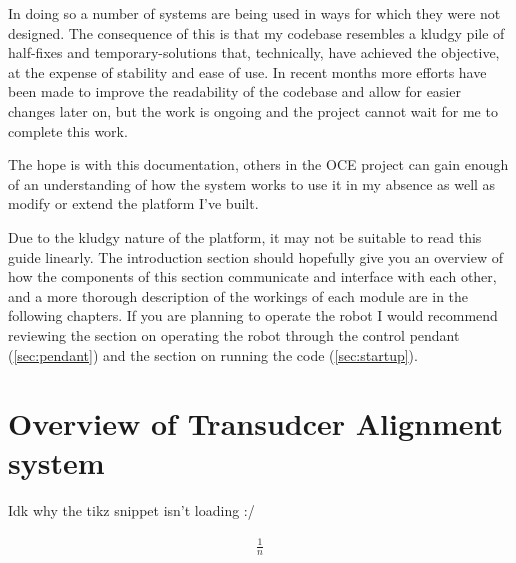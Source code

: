 \documentclass[11pt]{article}
\begin{document}
In doing so a number of systems are being used in ways for which they were not designed. The consequence of this is that my codebase resembles a kludgy pile of half-fixes and temporary-solutions that, technically, have achieved the objective, at the expense of stability and ease of use.
In recent months more efforts have been made to improve the readability of the codebase and allow for easier changes later on, but the work is ongoing and the project cannot wait for me to complete this work.

The hope is with this documentation, others in the OCE project can gain enough of an understanding of how the system works to use it in my absence as well as modify or extend the platform I've built.

Due to the kludgy nature of the platform, it may not be suitable to read this guide linearly. The introduction section should hopefully give you an overview of how the components of this section communicate and interface with each other, and a more thorough description of the workings of each module are in the following chapters.
If you are planning to operate the robot I would recommend reviewing the section on operating the robot through the control pendant (\autoref{sec:pendant}) and the section on running the code (\autoref{sec:startup}).

\section{Overview of Transudcer Alignment system}
Idk why the tikz snippet isn't loading :/



\begin{align*}
\frac{1}{n}
\end{align*}
\end{document}
